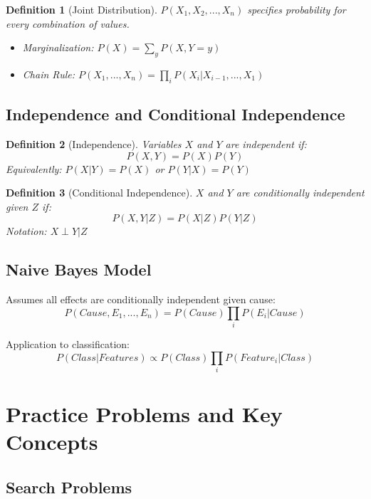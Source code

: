 \documentclass[11pt,letterpaper]{article}
\newtheorem{definition}{Definition}[section]
\begin{document}
\begin{definition}[Joint Distribution]
$P(X_1, X_2, ..., X_n)$ specifies probability for every combination of values.
\begin{itemize}
    \item Marginalization: $P(X) = \sum_y P(X,Y=y)$
    \item Chain Rule: $P(X_1,...,X_n) = \prod_i P(X_i|X_{i-1},...,X_1)$
\end{itemize}
\end{definition}

\subsection{Independence and Conditional Independence}

\begin{definition}[Independence]
Variables $X$ and $Y$ are independent if:
$$P(X,Y) = P(X)P(Y)$$
Equivalently: $P(X|Y) = P(X)$ or $P(Y|X) = P(Y)$
\end{definition}

\begin{definition}[Conditional Independence]
$X$ and $Y$ are conditionally independent given $Z$ if:
$$P(X,Y|Z) = P(X|Z)P(Y|Z)$$
Notation: $X \perp Y | Z$
\end{definition}

\subsection{Naive Bayes Model}

\begin{concept}
Assumes all effects are conditionally independent given cause:
$$P(Cause, E_1, ..., E_n) = P(Cause) \prod_i P(E_i|Cause)$$

Application to classification:
$$P(Class|Features) \propto P(Class) \prod_i P(Feature_i|Class)$$
\end{concept}

\section{Practice Problems and Key Concepts}

\subsection{Search Problems}
\end{document}
